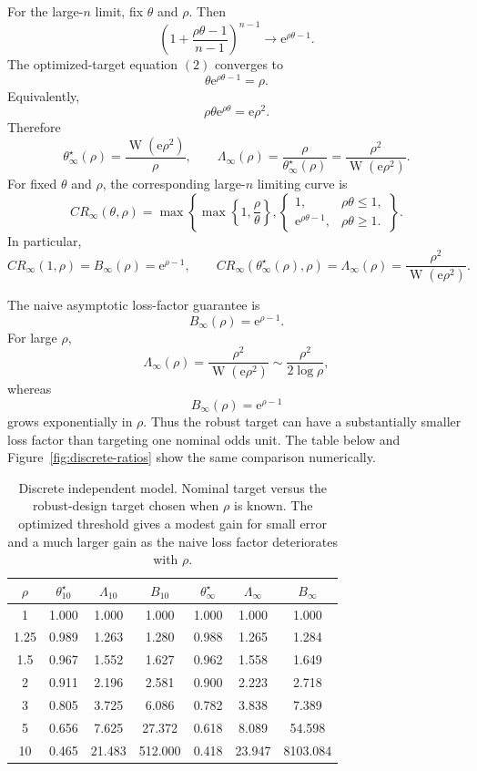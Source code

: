 \documentclass[11pt,a4paper]{article}
\DeclareMathOperator{\LambertW}{W}
\newcommand{\e}{\mathrm e}
\begin{document}
For the large-\(n\) limit, fix \(\theta\) and \(\rho\).  Then
\[
  \left(1+\frac{\rho\theta-1}{n-1}\right)^{n-1}\to \e^{\rho\theta-1}.
\]
The optimized-target equation \((2)\) converges to
\[
  \theta\e^{\rho\theta-1}=\rho.
\]
Equivalently,
\[
  \rho\theta\e^{\rho\theta}=\e\rho^2.
\]
Therefore
\[
  \boxed{
  \theta_\infty^\star(\rho)=\frac{\LambertW(\e\rho^2)}{\rho},
  \qquad
  \Lambda_\infty(\rho)=\frac{\rho}{\theta_\infty^\star(\rho)}
  =
  \frac{\rho^2}{\LambertW(\e\rho^2)}.
  }
  \tag{6}
\]
For fixed \(\theta\) and \(\rho\), the corresponding large-\(n\) limiting curve is
\[
  \boxed{
  CR_\infty(\theta,\rho)
  =
  \max\left\{
    \max\left\{1,\frac{\rho}{\theta}\right\},
    \begin{cases}
      1, & \rho\theta\le1,\\
      \e^{\rho\theta-1}, & \rho\theta\ge1.
    \end{cases}
  \right\}.
  }
  \tag{CR3}
\]
In particular,
\[
  CR_\infty(1,\rho)=B_\infty(\rho)=\e^{\rho-1},
  \qquad
  CR_\infty(\theta_\infty^\star(\rho),\rho)
  =
  \Lambda_\infty(\rho)
  =
  \frac{\rho^2}{\LambertW(\e\rho^2)}.
\]


The naive asymptotic loss-factor guarantee is
\[
  \boxed{
  B_\infty(\rho)=\e^{\rho-1}.
  }
  \tag{7}
\]
For large \(\rho\),
\[
  \Lambda_\infty(\rho)
  =\frac{\rho^2}{\LambertW(\e\rho^2)}
  \sim
  \frac{\rho^2}{2\log\rho},
\]
whereas
\[
  B_\infty(\rho)=\e^{\rho-1}
\]
grows exponentially in \(\rho\).  Thus the robust target can have a substantially
smaller loss factor than targeting one nominal odds unit.  The table
below and Figure~\ref{fig:discrete-ratios} show the same comparison numerically.

\begin{table}[ht]
\centering
\caption{Discrete independent model.  Nominal target versus the
robust-design target chosen when \(\rho\) is known.  The optimized threshold
gives a modest gain for small error and a much larger gain as the naive loss
factor deteriorates with \(\rho\).}
\begin{tabular}{c c c c c c c}
\toprule
\(\rho\)
& \(\theta^\star_{10}\)
& \(\Lambda_{10}\)
& \(B_{10}\)
& \(\theta^\star_\infty\)
& \(\Lambda_\infty\)
& \(B_\infty\)\\
\midrule
1 & 1.000 & 1.000 & 1.000 & 1.000 & 1.000 & 1.000 \\
1.25 & 0.989 & 1.263 & 1.280 & 0.988 & 1.265 & 1.284 \\
1.5 & 0.967 & 1.552 & 1.627 & 0.962 & 1.558 & 1.649 \\
2 & 0.911 & 2.196 & 2.581 & 0.900 & 2.223 & 2.718 \\
3 & 0.805 & 3.725 & 6.086 & 0.782 & 3.838 & 7.389 \\
5 & 0.656 & 7.625 & 27.372 & 0.618 & 8.089 & 54.598 \\
10 & 0.465 & 21.483 & 512.000 & 0.418 & 23.947 & 8103.084 \\
\bottomrule
\end{tabular}
\end{table}
\end{document}
